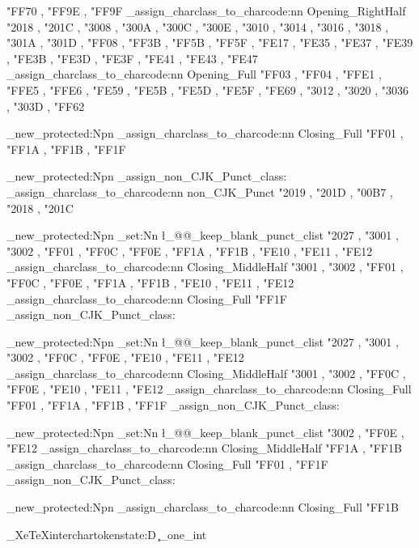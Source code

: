 {{%
        "FF70 , "FF9E , "FF9F
      }
    \@@_assign_charclass_to_charcode:nn { Opening_RightHalf }
      {
        "2018 , "201C ,
        "3008 , "300A , "300C , "300E , "3010 ,
        "3014 , "3016 , "3018 , "301A , "301D ,
        "FF08 , "FF3B , "FF5B , "FF5F ,
        "FE17 , "FE35 , "FE37 , "FE39 , "FE3B ,
        "FE3D , "FE3F , "FE41 , "FE43 , "FE47
      }
    \@@_assign_charclass_to_charcode:nn { Opening_Full }
      {
        "FF03 , "FF04 , "FFE1 , "FFE5 , "FFE6 ,
        "FE59 , "FE5B , "FE5D , "FE5F , "FE69 ,
        "3012 , "3020 , "3036 , "303D ,
        "FF62
      }
  }
\ChineseSimplifiedH

\cs_new_protected:Npn \ChineseSimplifiedV
  {
    \ChineseSimplifiedH
    \@@_assign_charclass_to_charcode:nn { Closing_Full }
      {
        "FF01 , "FF1A , "FF1B , "FF1F
      }
  }

\cs_new_protected:Npn \@@_assign_non_CJK_Punct_class:
  {
    \@@_assign_charclass_to_charcode:nn { non_CJK_Punct }
      {
        "2019 , "201D ,
        "00B7 ,
        "2018 , "201C
      }
  }

\cs_new_protected:Npn \ChineseTraditionalH
  {
    \ChineseSimplifiedH
    \clist_set:Nn \l_@@_keep_blank_punct_clist
      {
        "2027 ,
        "3001 , "3002 , "FF01 , "FF0C , "FF0E ,
        "FF1A , "FF1B ,
        "FE10 , "FE11 , "FE12
      }
    \@@_assign_charclass_to_charcode:nn { Closing_MiddleHalf }
      {
        "3001 , "3002 , "FF01 , "FF0C , "FF0E ,
        "FF1A , "FF1B ,
        "FE10 , "FE11 , "FE12
      }
    \@@_assign_charclass_to_charcode:nn { Closing_Full }
      {
        "FF1F
      }
    \@@_assign_non_CJK_Punct_class:
  }

\cs_new_protected:Npn \ChineseTraditionalV
  {
    \ChineseSimplifiedH
    \clist_set:Nn \l_@@_keep_blank_punct_clist
      {
        "2027 ,
        "3001 , "3002 , "FF0C , "FF0E ,
        "FE10 , "FE11 , "FE12
      }
    \@@_assign_charclass_to_charcode:nn { Closing_MiddleHalf }
      {
        "3001 , "3002 , "FF0C , "FF0E ,
        "FE10 , "FE11 , "FE12
      }
    \@@_assign_charclass_to_charcode:nn { Closing_Full }
      {
        "FF01 , "FF1A , "FF1B , "FF1F
      }
    \@@_assign_non_CJK_Punct_class:
  }

\cs_new_protected:Npn \JapaneseH
  {
    \ChineseSimplifiedH
    \clist_set:Nn \l_@@_keep_blank_punct_clist
      {
        "3002 , "FF0E , "FE12
      }
    \@@_assign_charclass_to_charcode:nn { Closing_MiddleHalf }
      {
        "FF1A , "FF1B
      }
    \@@_assign_charclass_to_charcode:nn { Closing_Full }
      {
        "FF01 , "FF1F
      }
    \@@_assign_non_CJK_Punct_class:
  }

\cs_new_protected:Npn \JapaneseV
  {
    \JapaneseH
    \@@_assign_charclass_to_charcode:nn { Closing_Full }
      {
        "FF1B
      }
  }


\tex_XeTeXinterchartokenstate:D \c_one_int

\ExplSyntaxOff
\makeatother
